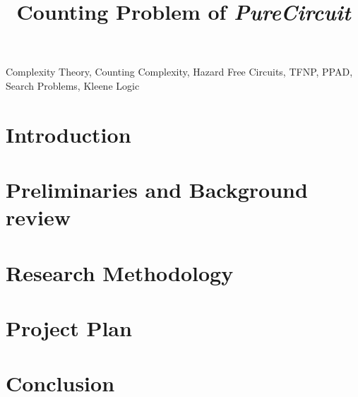\documentclass{IEEEtran}
\begin{document}
\title{Counting Problem of \textit{PureCircuit}}

\author{
}

\maketitle

\begin{abstract}

\end{abstract}

\begin{IEEEkeywords} %
    Complexity Theory, Counting Complexity, Hazard Free Circuits, TFNP, PPAD, Search Problems, Kleene Logic
\end{IEEEkeywords}

\section{Introduction}


\section{Preliminaries and Background review}


\section{Research Methodology} 


\section{Project Plan} 


\section{Conclusion} 

    


\end{document}
